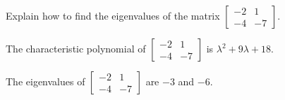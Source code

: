 
\begin{exerciseStatement}


Explain how to find the eigenvalues of the matrix \( \left[\begin{array}{cc}
-2 & 1 \\
-4 & -7
\end{array}\right] \).


\end{exerciseStatement}
    
\begin{exerciseAnswer} 


The characteristic polynomial of \( \left[\begin{array}{cc}
-2 & 1 \\
-4 & -7
\end{array}\right] \) is \( \lambda^{2} + 9 \lambda + 18 \).



The eigenvalues of \( \left[\begin{array}{cc}
-2 & 1 \\
-4 & -7
\end{array}\right] \) are \( -3 \) and \( -6 \).


\end{exerciseAnswer}
    
